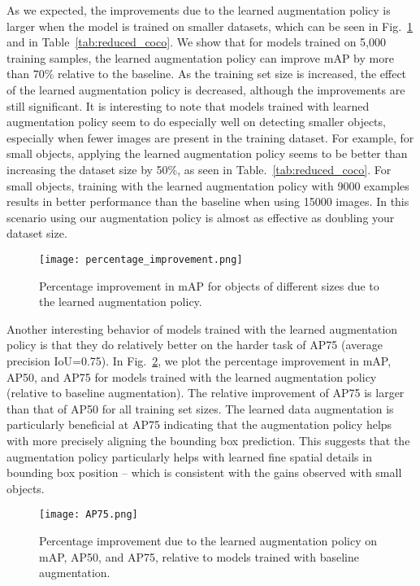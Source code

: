 \documentclass[10pt,twocolumn,letterpaper]{article}
\begin{document}
As we expected, the improvements due to the learned augmentation policy is larger when the model is trained on smaller datasets, which can be seen in Fig.~\ref{fig:percentage_improvement} and in Table~\ref{tab:reduced_coco}. We show that for models trained on 5,000 training samples, the learned augmentation policy can improve mAP by more than 70\% relative to the baseline. As the training set size is increased, the effect of the learned augmentation policy is decreased, although the improvements are still significant. It is interesting to note that models trained with learned augmentation policy seem to do especially well on detecting smaller objects, especially when fewer images are present in the training dataset. For example, for small objects, applying the learned augmentation policy seems to be better than increasing the dataset size by 50\%, as seen in Table.~\ref{tab:reduced_coco}. For small objects, training with the learned augmentation policy with 9000 examples results in better performance than the baseline when using 15000 images. In this scenario using our augmentation policy is almost as effective as doubling your dataset size.

\begin{figure}[h!]
\centering
\texttt{[image: percentage\_improvement.png]}
\caption{Percentage improvement in mAP for objects of different sizes due to the learned augmentation policy.}
\label{fig:percentage_improvement}
\end{figure}

Another interesting behavior of models trained with the learned augmentation policy is that they do relatively better on the harder task of AP75 (average precision IoU=0.75). In Fig.~\ref{fig:AP75}, we plot the percentage improvement in mAP, AP50, and AP75 for models trained with the learned augmentation policy (relative to baseline augmentation). The relative improvement of AP75 is larger than that of AP50 for all training set sizes. The learned data augmentation is particularly beneficial at AP75 indicating that the augmentation policy helps with more precisely aligning the bounding box prediction. This suggests that the augmentation policy particularly helps with learned fine spatial details in bounding box position -- which is consistent with the gains observed with small objects.

\begin{figure}[h!]
\centering
\texttt{[image: AP75.png]}
\caption{Percentage improvement due to the learned augmentation policy on mAP, AP50, and AP75, relative to models trained with baseline augmentation.  
}
\label{fig:AP75}
\end{figure}
\end{document}
